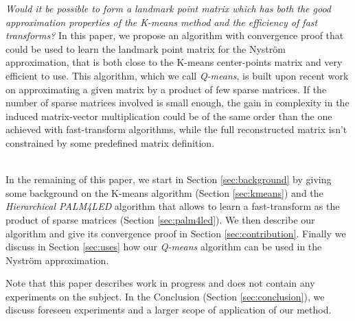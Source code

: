 \textit{Would it be possible to form a landmark point matrix which has both the good approximation properties of the K-means method and the efficiency of fast transforms?} In this paper, we propose an algorithm with convergence proof that could be used to learn the landmark point matrix for the Nyström approximation, that is both close to the K-means center-points matrix and very efficient to use. This algorithm, which we call \textit{Q-means}, is built upon recent work \cite{magoarou2014learning} on approximating a given matrix by a product of few sparse matrices. If the number of sparse matrices involved is small enough, the gain in complexity in the induced matrix-vector multiplication could be of the same order than the one achieved with fast-transform algorithms, while the full reconstructed matrix isn't constrained by some predefined matrix definition.

~\\
In the remaining of this paper, we start in Section \ref{sec:background} by giving some background on the K-means algorithm (Section \ref{sec:kmeans}) and the \textit{Hierarchical PALM4LED} algorithm that allows to learn a fast-transform as the product of sparse matrices (Section \ref{sec:palm4led}). We then describe our algorithm and give its convergence proof in Section \ref{sec:contribution}. Finally we discuss in Section \ref{sec:uses} how our \textit{Q-means} algorithm can be used in the Nyström approximation.

Note that this paper describes work in progress and does not contain any experiments on the subject. In the Conclusion (Section \ref{sec:conclusion}), we discuss foreseen experiments and a larger scope of application of our method.

